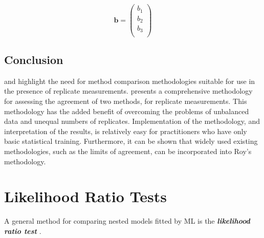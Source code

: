 \documentclass[12pt, a4paper]{report}
\theoremstyle{plain}
\theoremstyle{definition}
\theoremstyle{remark}
\begin{document}
	
	\begin{equation}
	\textbf{b}= \left( \begin{array}{c}
	b_{1} \\
	b_{2} \\
	b_{3} \\
	\end{array}  \right)
	\end{equation}
	
	
	
	
	
	
	
	
	
	
	
	
	
	
	
	
	
	
	
	
	
	
	
	
	\subsection{Conclusion}
	\citet{BXC2008} and \citet{ARoy2009} highlight the need for method comparison methodologies suitable for use in the presence of replicate measurements. \citet{ARoy2009} presents a comprehensive methodology for assessing the agreement of two methods, for replicate measurements. This methodology has the added benefit of overcoming the problems of unbalanced data and unequal numbers of replicates. Implementation of the methodology, and interpretation of the results, is relatively easy for practitioners who have only basic statistical training. Furthermore, it can be shown that widely used existing methodologies, such as the limits of agreement, can be incorporated into Roy's methodology.
	
	\newpage
	
	\section{Likelihood Ratio Tests}
	
	
	
	A general method for comparing nested models fitted by ML is the \textbf{\emph{likelihood ratio test}} \citep{Lehmann2006}.
	
\end{document}
